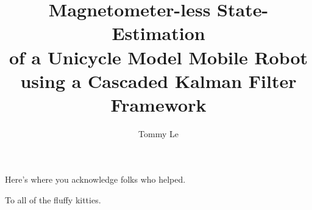 \documentclass[12pt]{niuthesis}
\begin{document}
\title{Magnetometer-less State-Estimation \\ of a Unicycle Model Mobile
Robot \\ using a Cascaded Kalman Filter Framework}

\author{Tommy Le}


\begin{abstract}

\end{abstract}

\begin{acknowledgments}
  Here's where you acknowledge folks who helped.

\end{acknowledgments}

\begin{dedication}
  To all of the fluffy kitties.

\end{dedication}

\MakeThesisPrologue %



\appendix
\end{document}
